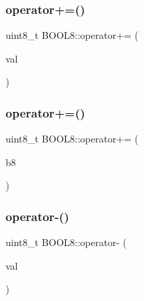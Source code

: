 \hypertarget{struct_b_o_o_l8_a5ba6ac7b2a2fbb9afe3f43968b9de74c}{}\label{struct_b_o_o_l8_a5ba6ac7b2a2fbb9afe3f43968b9de74c} 
\subsubsection{\texorpdfstring{operator+=()}{operator+=()}\hspace{0.1cm}{\footnotesize\ttfamily [1/2]}}
{\footnotesize\ttfamily uint8\+\_\+t B\+O\+O\+L8\+::operator+= (\begin{DoxyParamCaption}\item[{const uint8\+\_\+t}]{val }\end{DoxyParamCaption})\hspace{0.3cm}{\ttfamily [inline]}}

\hypertarget{struct_b_o_o_l8_a76a432f140c208e34d54a3ea950e3f69}{}\label{struct_b_o_o_l8_a76a432f140c208e34d54a3ea950e3f69} 
\subsubsection{\texorpdfstring{operator+=()}{operator+=()}\hspace{0.1cm}{\footnotesize\ttfamily [2/2]}}
{\footnotesize\ttfamily uint8\+\_\+t B\+O\+O\+L8\+::operator+= (\begin{DoxyParamCaption}\item[{const \hyperlink{struct_b_o_o_l8}{B\+O\+O\+L8}}]{b8 }\end{DoxyParamCaption})\hspace{0.3cm}{\ttfamily [inline]}}

\hypertarget{struct_b_o_o_l8_a2540f7471db3bd3c85853b917a7068fd}{}\label{struct_b_o_o_l8_a2540f7471db3bd3c85853b917a7068fd} 
\subsubsection{\texorpdfstring{operator-\/()}{operator-()}\hspace{0.1cm}{\footnotesize\ttfamily [1/2]}}
{\footnotesize\ttfamily uint8\+\_\+t B\+O\+O\+L8\+::operator-\/ (\begin{DoxyParamCaption}\item[{const uint8\+\_\+t}]{val }\end{DoxyParamCaption})\hspace{0.3cm}{\ttfamily [inline]}}

